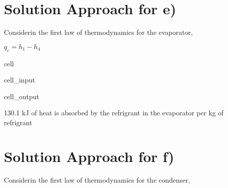 \documentclass[letterpaper,10pt,english]{jupyterBook}
\begin{document}
\section{Solution Approach for e)}
\label{\detokenize{notebooks/Chapter5/CH5-Q5:solution-approach-for-e}}
\sphinxAtStartPar
Considerin the first law of thermodynamics for the evaporator,

\sphinxAtStartPar
\(q_c=h_1-h_4\)

\begin{sphinxuseclass}{cell}\begin{sphinxVerbatimInput}

\begin{sphinxuseclass}{cell_input}
\begin{sphinxVerbatim}[commandchars=\\\{\}]
    
 
\end{sphinxVerbatim}

\end{sphinxuseclass}\end{sphinxVerbatimInput}
\begin{sphinxVerbatimOutput}

\begin{sphinxuseclass}{cell_output}
\begin{sphinxVerbatim}[commandchars=\\\{\}]
130.1 kJ of heat is absorbed by the refrigrant in the evaporator per kg of refrigrant
\end{sphinxVerbatim}

\end{sphinxuseclass}\end{sphinxVerbatimOutput}

\end{sphinxuseclass}

\section{Solution Approach for f)}
\label{\detokenize{notebooks/Chapter5/CH5-Q5:solution-approach-for-f}}
\sphinxAtStartPar
Considerin the first law of thermodynamics for the condenser,
\end{document}
